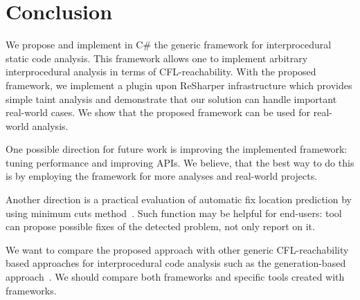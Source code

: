 \section{Conclusion}

We propose and implement in C\# the generic framework for interprocedural static code analysis.
This framework allows one to implement arbitrary interprocedural analysis in terms of CFL-reachability.
With the proposed framework, we implement a plugin upon ReSharper infrastructure which provides simple taint analysis and demonstrate that our solution can handle important real-world cases.
We show that the proposed framework can be used for real-world analysis.

One possible direction for future work is improving the implemented framework: tuning performance and improving APIs. 
We believe, that the best way to do this is by employing the framework for more analyses and real-world projects. 

Another direction is a practical evaluation of automatic fix location prediction by using minimum cuts method~\cite{10.1007/978-3-319-63390-9_27}.
Such function may be helpful for end-users: tool can propose possible fixes of the detected problem, not only report on it.

We want to compare the proposed approach with other generic CFL-reachability based approaches for interprocedural code analysis such as the generation-based approach~\cite{LPAR-21:Cauliflower_Solver_Generator_for}.
We should compare both frameworks and specific tools created with frameworks.
